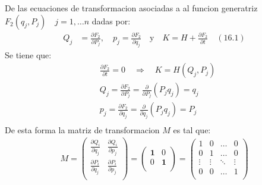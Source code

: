 \documentclass[a4paper]{article}
\begin{document}
    
    \begin{answer}[Punto 2]
        De las ecuaciones de transformacion asociadas a al funcion generatriz $F_2 (q_j, P_j)\quad j =1,\dots n$ dadas por:
        \begin{align*}
            Q_j &= \frac{\partial F_2}{\partial P_j},\quad  p_j = \frac{\partial F_2}{\partial q_j} \quad \text{y} \quad K = H+\frac{\partial F_2}{\partial t}  \quad (16.1)
        \end{align*}
        Se tiene que:
        \begin{align*}
            &\frac{\partial F_2}{\partial t} = 0 \quad \Rightarrow \quad K = H(Q_j,P_j)\\
            &Q_j = \frac{\partial F_2}{\partial P_j} = \frac{\partial}{\partial P_j} (P_j q_j) = q_j\\
            &p_j = \frac{\partial F_2}{\partial q_j} = \frac{\partial}{\partial q_j} (P_j q_j) = P_j\\ 
        \end{align*}
        De esta forma la matriz de transformacion $M$ es tal que:
        \begin{align*}
            M = \begin{pmatrix}
                \frac{\partial Q_i}{\partial q_j} & \frac{\partial Q_i}{\partial p_j}\\
                \frac{\partial P_i}{\partial q_j} & \frac{\partial P_i}{\partial p_j}\\
            \end{pmatrix} =\begin{pmatrix}
                \mathbf 1 & 0\\
                0 & \mathbf 1\\
            \end{pmatrix} =  \begin{pmatrix}
                1 & 0 & \dots & 0\\
                0 & 1 & \dots & 0\\
                \vdots & \vdots & \ddots & \vdots\\
                0 & 0 & \dots & 1\\
            \end{pmatrix}
        \end{align*}
    \end{answer}
    
\end{document}
